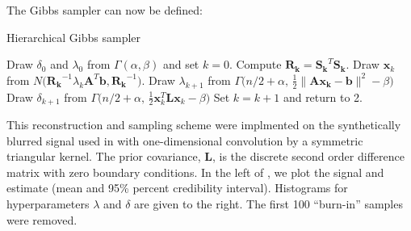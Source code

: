 \documentclass{article}
\newcommand{\vect}[1]{\boldsymbol{#1}}
\begin{document}
The Gibbs sampler can now be defined:

\begin{algorithm}
\caption{Hierarchical Gibbs sampler}
\label{alg1}
\begin{algorithmic}[1]
  \STATE Draw $\delta_0$ and $\lambda_0$ from $\Gamma(\alpha,\beta)$ and set $k=0$.
  \STATE Compute $\vect {R_k} = \vect{S_k}^T \vect{S_k}$. 
  \STATE Draw $\vect x_k$ from $N\Big( \vect{R_k}^{-1}\lambda_k \vect A^T\vect b, \vect{R_k}^{-1} \Big)$.
  \STATE Draw $\lambda_{k+1}$ from $\Gamma \Big(n/2+\alpha,\,\frac12\|\vect{Ax_k} - \vect b\|^2 - \beta \Big)$
  \STATE Draw $\delta_{k+1}$ from $\Gamma \Big(n/2+\alpha,\,\frac12\vect x_k^T\vect L\vect x_k - \beta \Big)$
  \STATE Set $k=k+1$ and return to 2.
\end{algorithmic}
\end{algorithm}


This reconstruction and sampling scheme were implmented on the synthetically blurred signal used in \cite{bardsley2012mcmc} with one-dimensional convolution by a symmetric triangular kernel. 
The prior covariance, $\vect L$, is the discrete second order difference matrix with zero boundary conditions. 
In the left of , we plot the signal and estimate (mean and 95\% percent credibility interval).  
Histograms for hyperparameters $\lambda$ and $\delta$ are given to the right. 
The first 100 ``burn-in'' samples were removed.
\end{document}

